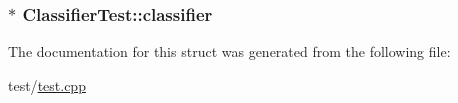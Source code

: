 \subsubsection[{\texorpdfstring{classifier}{classifier}}]{$\ast$ Classifier\+Test\+::classifier}\hypertarget{structClassifierTest_a28f0a8fabef6be4190f293e2cf4644de}{}\label{structClassifierTest_a28f0a8fabef6be4190f293e2cf4644de}


The documentation for this struct was generated from the following file\+:\begin{DoxyCompactItemize}
\item 
test/\hyperlink{test_8cpp}{test.\+cpp}\end{DoxyCompactItemize}

